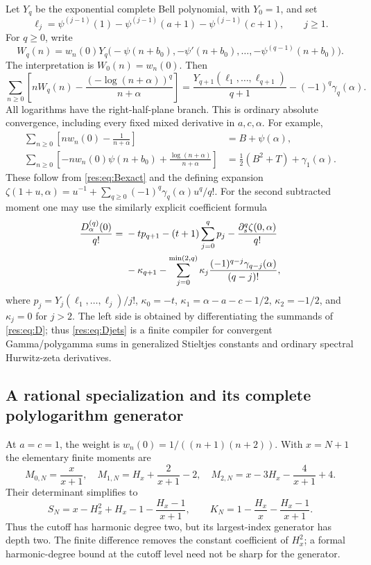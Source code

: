 \documentclass[11pt,letterpaper]{article}
\numberwithin{equation}{section}
\theoremstyle{plain}
\theoremstyle{definition}
\theoremstyle{remark}
\begin{document}
Let $Y_q$ be the exponential complete Bell polynomial, with $Y_0=1$,
and set
\[
 \ell_j=\psi^{(j-1)}(1)-\psi^{(j-1)}(a+1)
                    -\psi^{(j-1)}(c+1),\qquad j\geq1.
\]
For $q\geq0$, write
\[
 W_q(n)=w_n(0)Y_q\bigl(-\psi(n+b_0),-\psi'(n+b_0),
                         \ldots,-\psi^{(q-1)}(n+b_0)\bigr).
\]
The interpretation is $W_0(n)=w_n(0)$.  Then
\begin{equation}
 \boxed{\sum_{n\geq0}\left[
 nW_q(n)-\frac{(-\log(n+\alpha))^q}{n+\alpha}\right]
 =\frac{Y_{q+1}(\ell_1,\ldots,\ell_{q+1})}{q+1}
       -(-1)^q\gamma_q(\alpha).}\label{res:eq:Stieltjes}
\end{equation}
All logarithms have the right-half-plane branch.  This is ordinary
absolute convergence, including every fixed mixed derivative in
$a,c,\alpha$.  For example,
\begin{align*}
 \sum_{n\geq0}\left[nw_n(0)-\frac1{n+\alpha}\right]
   &=B+\psi(\alpha),\\
 \sum_{n\geq0}\left[-nw_n(0)\psi(n+b_0)
                 +\frac{\log(n+\alpha)}{n+\alpha}\right]
   &=\tfrac12(B^2+T)+\gamma_1(\alpha).
\end{align*}
These follow from \eqref{res:eq:Bexact} and the defining expansion
$\zeta(1+u,\alpha)=u^{-1}+\sum_{q\geq0}(-1)^q\gamma_q(\alpha)u^q/q!$.
For the second subtracted moment one may use the similarly explicit
coefficient formula
\begin{align}
 \frac{D_\alpha^{(q)}(0)}{q!}
 ={}&-t p_{q+1}-(t+1)\sum_{j=0}^q p_j
     -\frac{\partial_s^q\zeta(0,\alpha)}{q!}\notag\\
 &-\kappa_{q+1}
     -\sum_{j=0}^{\min(2,q)}\kappa_j
                    \frac{(-1)^{q-j}\gamma_{q-j}(\alpha)}{(q-j)!},
 \label{res:eq:Djets}
\end{align}
where $p_j=Y_j(\ell_1,\ldots,\ell_j)/j!$,
$\kappa_0=-t$, $\kappa_1=\alpha-a-c-1/2$,
$\kappa_2=-1/2$, and $\kappa_j=0$ for $j>2$.
The left side is obtained by differentiating the summands of
\eqref{res:eq:D}; thus \eqref{res:eq:Djets} is a finite compiler
for convergent Gamma/polygamma sums in generalized Stieltjes
constants and ordinary spectral Hurwitz-zeta derivatives.

\subsection{A rational specialization and its complete polylogarithm generator}
At $a=c=1$, the weight is $w_n(0)=1/((n+1)(n+2))$.
With $x=N+1$ the elementary finite moments are
\[
 M_{0,N}=\frac{x}{x+1},\quad
 M_{1,N}=H_x+\frac2{x+1}-2,\quad
 M_{2,N}=x-3H_x-\frac4{x+1}+4.
\]
Their determinant simplifies to
\begin{equation}
 \boxed{S_N=x-H_x^2+H_x-1-\frac{H_x-1}{x+1},\qquad
 K_N=1-\frac{H_x}{x}-\frac{H_x-1}{x+1}.}\label{res:eq:rational}
\end{equation}
Thus the cutoff has harmonic degree two, but its largest-index
generator has depth two.  The finite difference removes the constant
coefficient of $H_x^2$; a formal harmonic-degree bound at the cutoff
level need not be sharp for the generator.
\end{document}

